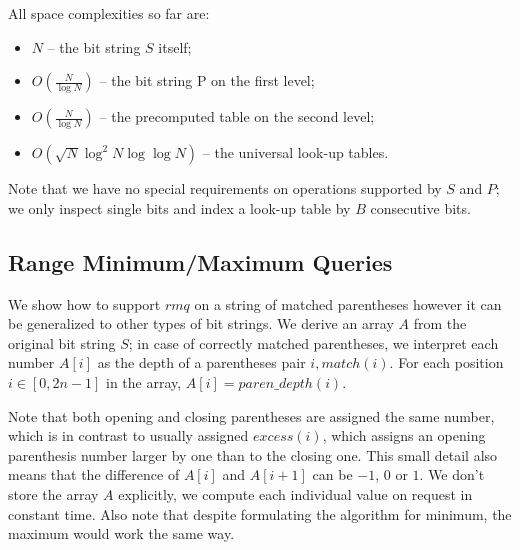 \bigskip

All space complexities so far are:
\begin{itemize}
	\item $N$ -- the bit string $S$ itself;
	\item $O(\frac{N}{\log N})$ -- the bit string P on the first level;
	\item $O(\frac{N}{\log N})$ -- the precomputed table on the second level;
	\item $O(\sqrt{N}\log^2 N \log\log N)$ -- the universal look-up tables.
\end{itemize}
Note that we have no special requirements on operations supported by $S$ and $P$; we only inspect single bits and index a look-up table by $B$ consecutive bits.


\subsection{Range Minimum/Maximum Queries}

We show how to support $rmq$ on a string of matched parentheses however it can be generalized to other types of bit strings.
We derive an array $A$ from the original bit string $S$; in case of correctly matched parentheses, we interpret each number $A[i]$ as the depth of a parentheses pair $i, match(i)$.
For each position $i \in [0, 2n-1]$ in the array, $ A[i] = paren\_depth(i)$.

Note that both opening and closing parentheses are assigned the same number, which is in contrast to usually assigned $excess(i)$, which assigns an opening parenthesis number larger by one than to the closing one.
This small detail also means that the difference of $A[i]$ and $A[i+1]$ can be $-1$, $0$ or $1$.
We don't store the array $A$ explicitly, we compute each individual value on request in constant time.
Also note that despite formulating the algorithm for minimum, the maximum would work the same way.

